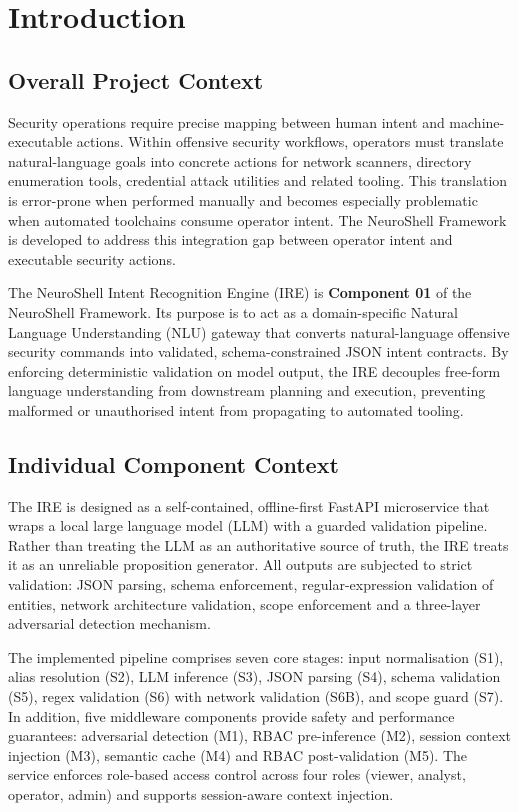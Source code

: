 \chapter{Introduction}\label{ch:intro}

\section{Overall Project Context}\label{sec:intro-overall}

Security operations require precise mapping between human intent and machine-executable actions. Within offensive security workflows, operators must translate natural-language goals into concrete actions for network scanners, directory enumeration tools, credential attack utilities and related tooling. This translation is error-prone when performed manually and becomes especially problematic when automated toolchains consume operator intent. The NeuroShell Framework is developed to address this integration gap between operator intent and executable security actions.

The NeuroShell Intent Recognition Engine (IRE) is \textbf{Component 01} of the NeuroShell Framework. Its purpose is to act as a domain-specific Natural Language Understanding (NLU) gateway that converts natural-language offensive security commands into validated, schema-constrained JSON intent contracts. By enforcing deterministic validation on model output, the IRE decouples free-form language understanding from downstream planning and execution, preventing malformed or unauthorised intent from propagating to automated tooling.

\section{Individual Component Context}\label{sec:intro-individual}

The IRE is designed as a self-contained, offline-first FastAPI microservice that wraps a local large language model (LLM) with a guarded validation pipeline. Rather than treating the LLM as an authoritative source of truth, the IRE treats it as an unreliable proposition generator. All outputs are subjected to strict validation: JSON parsing, schema enforcement, regular-expression validation of entities, network architecture validation, scope enforcement and a three-layer adversarial detection mechanism.

The implemented pipeline comprises seven core stages: input normalisation (S1), alias resolution (S2), LLM inference (S3), JSON parsing (S4), schema validation (S5), regex validation (S6) with network validation (S6B), and scope guard (S7). In addition, five middleware components provide safety and performance guarantees: adversarial detection (M1), RBAC pre-inference (M2), session context injection (M3), semantic cache (M4) and RBAC post-validation (M5). The service enforces role-based access control across four roles (viewer, analyst, operator, admin) and supports session-aware context injection.

